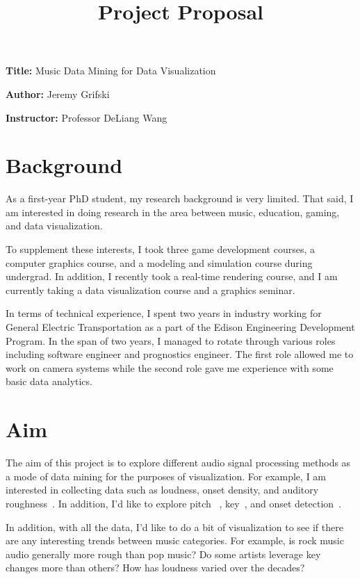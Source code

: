 \documentclass[12pt, a4paper]{article}
\title{Project Proposal}
\author{}
\date{}
\newcommand{\namelistlabel}[1]{\mbox{#1}\hfil}
\newenvironment{namelist}[1]{%
\begin{list}{}
    {
        \let\makelabel\namelistlabel
        \settowidth{\labelwidth}{#1}
        \setlength{\leftmargin}{1.1\labelwidth}
    }
  }{%
\end{list}}
\begin{document}
\maketitle

\begin{namelist}{xxxxxxxxxxxx}
\item[{\bf Title:}]
	Music Data Mining for Data Visualization
\item[{\bf Author:}]
	Jeremy Grifski
\item[{\bf Instructor:}]
	Professor DeLiang Wang
\end{namelist}

\section*{Background}

As a first-year PhD student, my research background is very limited. That said,
I am interested in doing research in the area between music, education, gaming,
and data visualization.

To supplement these interests, I took three game development courses, a
computer graphics course, and a modeling and simulation course during undergrad.
In addition, I recently took a real-time rendering course, and I am
currently taking a data visualization course and a graphics seminar.

In terms of technical experience, I spent two years in industry working for
General Electric Transportation as a part of the Edison Engineering Development
Program. In the span of two years, I managed to rotate through various roles
including software engineer and prognostics engineer. The first role allowed
me to work on camera systems while the second role gave me experience with
some basic data analytics.

\section*{Aim}

The aim of this project is to explore different audio signal processing methods
as a mode of data mining for the purposes of visualization. For example, I am
interested in collecting data such as loudness, onset density, and auditory
roughness~\cite{jeong}. In addition, I'd like to explore pitch~\cite{cuadra}
\cite{rabiner}, key~\cite{zhu}, and onset detection~\cite{bello}.

In addition, with all the data, I'd like to do a bit of visualization to see
if there are any interesting trends between music categories. For example,
is rock music audio generally more rough than pop music? Do some artists
leverage key changes more than others? How has loudness varied over the
decades?
\end{document}
